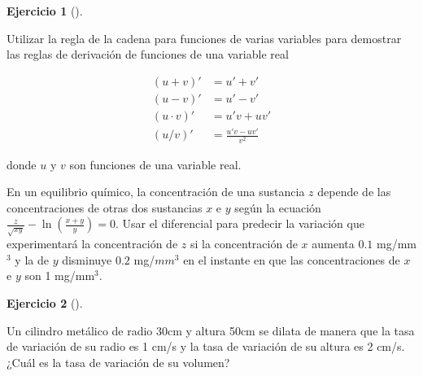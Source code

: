 \documentclass[
  a4paper,
]{scrreport}
\theoremstyle{definition}
\newtheorem{exercise}{Ejercicio}[chapter]
\theoremstyle{remark}
\begin{document}
\begin{exercise}[]\protect\hypertarget{exr-reglas-derivacion}{}\label{exr-reglas-derivacion}

Utilizar la regla de la cadena para funciones de varias variables para
demostrar las reglas de derivación de funciones de una variable real

\begin{align*}
(u+v)' &= u' + v'\\
(u-v)' &= u' - v'\\
(u\cdot v)' &= u'v + uv'\\
(u/v)' &= \frac{u'v-uv'}{v^2}
\end{align*}

donde \(u\) y \(v\) son funciones de una variable real.

\end{exercise}

\begin{tcolorbox}[enhanced jigsaw, bottomrule=.15mm, breakable, colframe=quarto-callout-tip-color-frame, toprule=.15mm, opacityback=0, left=2mm, opacitybacktitle=0.6, colback=white, toptitle=1mm, titlerule=0mm, bottomtitle=1mm, arc=.35mm, title=\textcolor{quarto-callout-tip-color}{\faLightbulb}\hspace{0.5em}{Solución}, rightrule=.15mm, colbacktitle=quarto-callout-tip-color!10!white, leftrule=.75mm, coltitle=black]

En un equilibrio químico, la concentración de una sustancia \(z\)
depende de las concentraciones de otras dos sustancias \(x\) e \(y\)
según la ecuación
\(\frac{z}{\sqrt{xy}}-\ln\left(\frac{x+y}{y}\right) = 0\). Usar el
diferencial para predecir la variación que experimentará la
concentración de \(z\) si la concentración de \(x\) aumenta \(0.1\)
mg/mm\(^3\) y la de \(y\) disminuye \(0.2\) mg/\(mm^3\) en el instante
en que las concentraciones de \(x\) e \(y\) son 1 mg/mm\(^3\).

\end{tcolorbox}

\begin{exercise}[]\protect\hypertarget{exr-variacion-volumen-cilindro}{}\label{exr-variacion-volumen-cilindro}

Un cilindro metálico de radio 30cm y altura 50cm se dilata de manera que
la tasa de variación de su radio es 1 cm/s y la tasa de variación de su
altura es 2 cm/s. ¿Cuál es la tasa de variación de su volumen?

\end{exercise}
\end{document}
